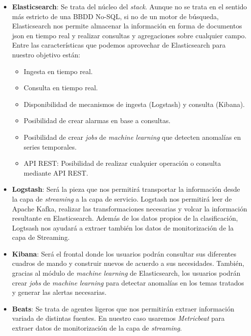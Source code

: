 \begin{itemize}

	\item \textbf{Elasticsearch}: Se trata del núcleo del \textit{stack}. Aunque no se trata en el sentido más estricto de una BBDD No-SQL, si no de un motor de búsqueda, Elasticsearch nos permite almacenar la información en forma de documentos json en tiempo real y realizar consultas y agregaciones sobre cualquier campo. Entre las características que podemos aprovechar de Elasticsearch para nuestro objetivo están: 
		\begin{itemize}
			\item Ingesta en tiempo real.
			\item Consulta en tiempo real. 
			\item Disponibilidad de mecanismos de ingesta (Logstash) y consulta (Kibana).
			\item Posibilidad de crear alarmas en base a consultas. 
			\item Posibilidad de crear \textit{jobs} de \textit{machine learning} que detecten anomalías en series temporales. 
			\item API REST: Posibilidad de realizar cualquier operación o consulta mediante API REST.
		\end{itemize}



	\item \textbf{Logstash}: Será la pieza que nos permitirá transportar la información desde la capa de \textit{streaming} a la capa de servicio. Logstash nos permitirá leer de Apache Kafka, realizar las transformaciones necesarias y volcar la información resultante en Elasticsearch. Además de los datos propios de la clasificación, Logtsash nos ayudará a extraer también los datos de monitorización de la capa de Streaming.
	
	\item \textbf{Kibana}: Será el frontal donde los usuarios podrán consultar sus diferentes cuadros de mando y construir nuevos de acuerdo a sus necesidades. También, gracias al módulo de \textit{machine learning} de Elasticsearch, los usuarios podrán crear \textit{jobs} de \textit{machine learning} para detectar anomalías en los temas tratados y generar las alertas necesarias.
	
	
	\item \textbf{Beats}: Se trata de agentes ligeros que nos permitirán extraer información variada de distintas fuentes. En nuestro caso usaremos \textit{Metricbeat} para extraer datos de monitorización de la capa de \textit{streaming}. 
	
	
	
		
	
		
\end{itemize}





